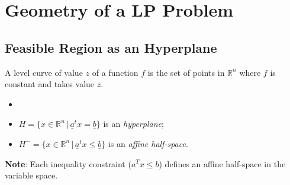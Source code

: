     \section{Geometry of a LP Problem}
        \subsection{Feasible Region as an Hyperplane}
            \begin{definition}
                A level curve of value $z$ of a function $f$ is the set of points in $\mathbb{R}^n$ where $f$ is constant and takes value $z$.
            \end{definition}
            
            \begin{definition}
                \begin{itemize}
                    \item[]
                    \item[] $ H = \{x \in \mathbb{R}^n \,\vert\, \underline{a}^tx = \underline{b}\}$ is an \emph{hyperplane};
                    \item[] $H^- = \{x \in \mathbb{R}^n \,\vert\, \underline{a}^tx \leq \underline{b}\}$ is an \emph{affine half-space}.
                \end{itemize}
           \end{definition}
           \textbf{Note}: Each inequality constraint ($a^Tx \leq b$) defines an affine half-space in the variable space.\\

